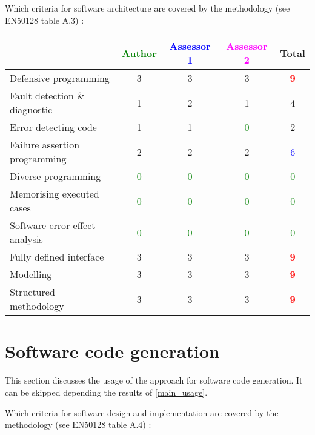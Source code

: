 Which criteria for software architecture are covered by the methodology
(see EN50128 table A.3) :

\begin{tabular}{|l | c | c | c | c|}
\hline
& \textcolor{green}{Author} & \textcolor{blue}{Assessor 1} & \textcolor{magenta}{Assessor 2} & Total \\
\hline
Defensive programming  & 3    & 3    & 3    & \textcolor{red}{\textbf{9}} \\
\hline 
Fault detection \& diagnostic  & 1    & 2    & 1    & 4    \\
\hline
Error detecting code  & 1    & 1    & \textcolor{green}{0} & 2    \\
\hline
Failure assertion programming & 2     & 2    & 2    & \textcolor{blue}{6} \\
\hline
Diverse programming & \textcolor{green}{0} & \textcolor{green}{0} & \textcolor{green}{0} & \textcolor{green}{0} \\
\hline
Memorising executed cases & \textcolor{green}{0} & \textcolor{green}{0} & \textcolor{green}{0} & \textcolor{green}{0} \\
\hline
Software error effect analysis & \textcolor{green}{0} & \textcolor{green}{0} & \textcolor{green}{0} & \textcolor{green}{0} \\
\hline
Fully defined interface & 3    & 3    & 3    & \textcolor{red}{\textbf{9}} \\
\hline
Modelling  & 3    & 3    & 3    & \textcolor{red}{\textbf{9}} \\
\hline
Structured methodology & 3    & 3    & 3    & \textcolor{red}{\textbf{9}} \\
\hline
\end{tabular}

\section{Software code generation}
This section discusses the usage of the approach for software code generation.
It can be skipped depending the results of \ref{main_usage}.

Which criteria for software design and implementation are covered by the methodology
(see EN50128 table A.4) :

